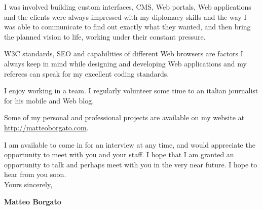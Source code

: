 \documentclass[11pt]{article}
\begin{document}
I was involved building custom interfaces, CMS, Web portals, Web applications and the clients were always impressed with my diplomacy skills and the way I was able to communicate to find out exactly what they wanted, and then bring the planned vision to life, working under their constant pressure.

W3C standards, SEO and capabilities of different Web browsers are factors I always keep in mind while designing and developing Web applications and my referees can speak for my excellent coding standards.

I enjoy working in a team. I regularly volunteer some time to an italian journalist for his mobile and Web blog.

Some of my personal and professional projects are available on my website at \url{http://matteoborgato.com}.

I am available to come in for an interview at any time, and would appreciate the opportunity to meet with you and your staff. I hope that I am granted an opportunity to talk and perhaps meet with you in the very near future. I hope to hear from you soon.
 \\[1.5em]

Yours sincerely,

%
{\bfseries Matteo Borgato}\\
%
\vfill%
\end{document}
